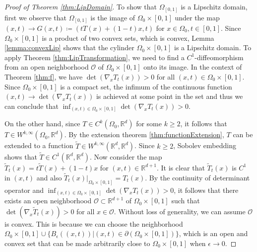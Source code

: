 \begin{proof}[Proof of Theorem \ref{thm:LipDomain}]
  To show that $\Omega_{[0,1]}$ is a Lipschitz domain, first we observe that $\Omega_{[0,1]}$ is the image of $\Omega_0\times [0,1]$ under the map
    $(x,t)\rightarrow G(x,t)  \coloneqq  (tT(x) + (1-t)x, t)$ for
    $x\in\Omega_0,t\in[0,1]$. Since $\Omega_0\times [0,1]$ is a
    product of two convex sets, which is convex, Lemma
    \ref{lemma:convexLip} shows that the cylinder
    $\Omega_0\times [0,1]$ is a Lipschitz domain. To apply Theorem
    \ref{thm:LipTransformation}, we need to find a
    $C^1$-diffeomorphism from an open neighborhood $\mathcal{O}$ of
    $\Omega_0\times [0,1]$ onto its image. In the context of Theorem
    \ref{thm:f}, we have $\det(\nabla_x T_t(x)) > 0$ for all
    $(x,t)\in\Omega_0\times[0,1]$. Since $\Omega_0\times[0,1]$ is a
    compact set, the infimum of the continuous function
    $(x,t)\rightarrow\det(\nabla_x T_t(x))$ is achieved at some point
    in the set and thus we can conclude that
    $\inf_{(x,t)\in\Omega_0\times[0,1]}\det(\nabla_x T_t(x)) > 0$.



    On the other hand, since $T\in C^k(\Omega_0, \mathbb{R}^d)$ for
    some $k\geq 2$, it follows that
    $T \in W^{k, \infty}(\Omega_0, \mathbb{R}^d)$. By the extension
    theorem \ref{thm:functionExtension}, $T$ can be extended to a
    function $\tilde{T}\in W^{k, \infty}(\mathbb{R}^d,
    \mathbb{R}^d)$. Since $k \geq 2$, Sobolev embedding shows that
    $\tilde{T}\in C^1(\mathbb{R}^d, \mathbb{R}^d)$. Now consider the
    map $\tilde{T}_t(x) = t\tilde{T}(x) + (1-t)x$ for
    $(x,t)\in\mathbb{R}^{d+1}$. It is clear that $\tilde{T}_t(x)$ is
    $C^1$ in $(x,t)$ and also
    $\tilde{T}_t(x)|_{\Omega_0\times[0,1]} = T_t(x)$. By the
    continuity of determinant operator and
    $\inf_{(x,t)\in\Omega_0\times[0,1]}\det(\nabla_x T_t(x)) > 0$, it
    follows that there exists an open neighborhood
    $\mathcal{O}\subset\mathbb{R}^{d+1}$ of $\Omega_0\times[0,1]$ such
    that $\det(\nabla_x \tilde{T}_t(x)) > 0$ for all
    $x\in\mathcal{O}$. Without loss of generality, we can assume
    $\mathcal{O}$ is convex. This is because we can choose the
    neighborhood
    $\Omega_0\times[0,1]\cup
    \{B_\epsilon((x,t))|(x,t)\in\partial(\Omega_0\times[0,1])\}$, which
    is an open and convex set that can be made arbitrarily close to
    $\Omega_0\times[0,1]$ when $\epsilon\rightarrow 0$.


\end{proof}
